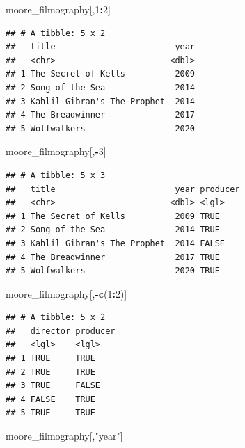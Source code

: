 \documentclass[
]{book}
\newenvironment{Shaded}{\begin{snugshade}}{\end{snugshade}}
\newcommand{\DecValTok}[1]{\textcolor[rgb]{0.00,0.00,0.81}{#1}}
\newcommand{\KeywordTok}[1]{\textcolor[rgb]{0.13,0.29,0.53}{\textbf{#1}}}
\newcommand{\NormalTok}[1]{#1}
\newcommand{\OperatorTok}[1]{\textcolor[rgb]{0.81,0.36,0.00}{\textbf{#1}}}
\newcommand{\StringTok}[1]{\textcolor[rgb]{0.31,0.60,0.02}{#1}}
\begin{document}
\begin{Shaded}
\begin{Highlighting}[]
\NormalTok{moore_filmography[,}\DecValTok{1}\OperatorTok{:}\DecValTok{2}\NormalTok{]}
\end{Highlighting}
\end{Shaded}

\begin{verbatim}
## # A tibble: 5 x 2
##   title                        year
##   <chr>                       <dbl>
## 1 The Secret of Kells          2009
## 2 Song of the Sea              2014
## 3 Kahlil Gibran's The Prophet  2014
## 4 The Breadwinner              2017
## 5 Wolfwalkers                  2020
\end{verbatim}

\begin{Shaded}
\begin{Highlighting}[]
\NormalTok{moore_filmography[,}\OperatorTok{-}\DecValTok{3}\NormalTok{]}
\end{Highlighting}
\end{Shaded}

\begin{verbatim}
## # A tibble: 5 x 3
##   title                        year producer
##   <chr>                       <dbl> <lgl>   
## 1 The Secret of Kells          2009 TRUE    
## 2 Song of the Sea              2014 TRUE    
## 3 Kahlil Gibran's The Prophet  2014 FALSE   
## 4 The Breadwinner              2017 TRUE    
## 5 Wolfwalkers                  2020 TRUE
\end{verbatim}

\begin{Shaded}
\begin{Highlighting}[]
\NormalTok{moore_filmography[,}\OperatorTok{-}\KeywordTok{c}\NormalTok{(}\DecValTok{1}\OperatorTok{:}\DecValTok{2}\NormalTok{)]}
\end{Highlighting}
\end{Shaded}

\begin{verbatim}
## # A tibble: 5 x 2
##   director producer
##   <lgl>    <lgl>   
## 1 TRUE     TRUE    
## 2 TRUE     TRUE    
## 3 TRUE     FALSE   
## 4 FALSE    TRUE    
## 5 TRUE     TRUE
\end{verbatim}

\begin{Shaded}
\begin{Highlighting}[]
\NormalTok{moore_filmography[,}\StringTok{"year"}\NormalTok{]}
\end{Highlighting}
\end{Shaded}
\end{document}
